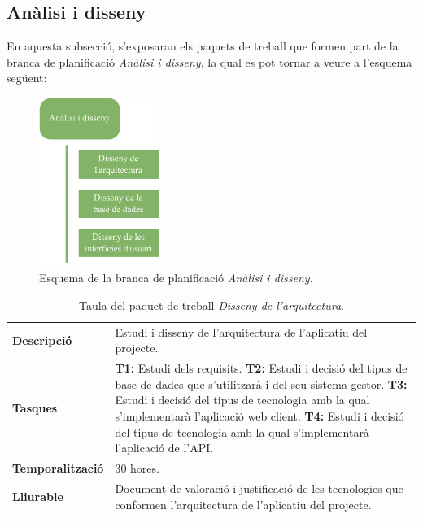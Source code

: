 \documentclass[a4paper,12pt]{ThesisStyle}
\begin{document}
\subsection{Anàlisi i disseny}
\label{subsec:analisi_disseny}

En aquesta subsecció, s'exposaran els paquets de treball que formen part de la branca de planificació \emph{Anàlisi i disseny}, la qual es pot tornar a veure a l'esquema següent:

\begin{figure}[htpb]
	\centering
	\includegraphics[width=0.35\textwidth]{assets/working_packages/analisiDisseny.pdf}
	\caption{\label{img:pt_analisi_disseny}Esquema de la branca de planificació \emph{Anàlisi i disseny}.}
\end{figure}

\begin{table}[H]
  \begin{tabularx}{\textwidth}{l | X}
    \toprule
    \rowcolor{Green}
    \multicolumn{2}{c}{\textbf{PT\_2.1:} Disseny de l'arquitectura}\\
    \midrule[0.9pt]
    \textbf{Descripció}       & Estudi i disseny de l'arquitectura de l'aplicatiu del projecte.\\
    \midrule
    \textbf{Tasques}          & \textbf{T1:} Estudi dels requisits.
    \newline \textbf{T2:} Estudi i decisió del tipus de base de dades que s'utilitzarà i del seu sistema gestor.
    \newline \textbf{T3:} Estudi i decisió del tipus de tecnologia amb la qual s'implementarà l'aplicació web client.
    \newline \textbf{T4:} Estudi i decisió del tipus de tecnologia amb la qual s'implementarà l'aplicació de l'API.\\
    \midrule
    \textbf{Temporalització}  & 30 hores.\\
    \midrule
    \textbf{Lliurable}        & Document de valoració i justificació de les tecnologies que conformen l'arquitectura de l'aplicatiu del projecte.\\
    \bottomrule
  \end{tabularx}
  \caption{\label{taula:pt_2.1} Taula del paquet de treball \emph{Disseny de l'arquitectura}.}
\end{table}
\end{document}
